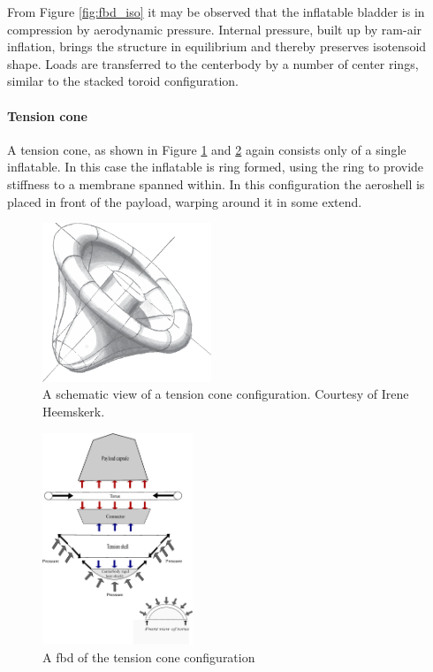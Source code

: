 From Figure  \ref{fig:fbd_iso} it may be observed that the inflatable bladder is in compression by aerodynamic pressure. Internal pressure, built up by ram-air inflation, brings the structure in equilibrium and thereby preserves isotensoid shape. Loads are transferred to the centerbody by a number of center rings, similar to the stacked toroid configuration.

\paragraph{Tension cone}

A tension cone, as shown in Figure  \ref{fig:conc_tension} and \ref{fig:fbd_tension} again consists only of a single inflatable. In this case the inflatable is ring formed, using the ring to provide stiffness to a membrane spanned within. In this configuration the aeroshell is placed in front of the payload, warping around it in some extend.

\begin{figure}[H]
\centering
\includegraphics[width = 0.45\textwidth]{Figure/tension_cone.eps}
\caption{A schematic view of a tension cone configuration. Courtesy of Irene Heemskerk.}
\label{fig:conc_tension}
\end{figure}

\begin{figure}[H]
\centering
\includegraphics[width = 0.4\textwidth]{Figure/FBD_tensioncone.eps}
\caption{A \gls{fbd} of the tension cone configuration}
\label{fig:fbd_tension}
\end{figure}

